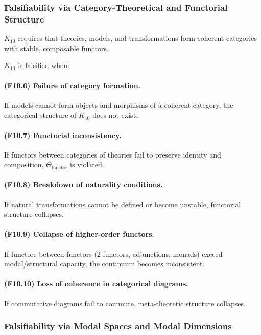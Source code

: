\subsubsection{Falsifiability via Category-Theoretical and Functorial Structure}

$K_{10}$ requires that theories, models, and transformations form coherent
categories with stable, composable functors.

$K_{10}$ is falsified when:

\paragraph{(F10.6) Failure of category formation.}
If models cannot form objects and morphisms of a coherent category,
the categorical structure of $K_{10}$ does not exist.

\paragraph{(F10.7) Functorial inconsistency.}
If functors between categories of theories fail to preserve identity
and composition, $\Theta_{\mathrm{functor}}$ is violated.

\paragraph{(F10.8) Breakdown of naturality conditions.}
If natural transformations cannot be defined or become unstable,
functorial structure collapses.

\paragraph{(F10.9) Collapse of higher-order functors.}
If functors between functors (2-functors, adjunctions, monads)
exceed modal/structural capacity, the continuum becomes inconsistent.

\paragraph{(F10.10) Loss of coherence in categorical diagrams.}
If commutative diagrams fail to commute, 
meta-theoretic structure collapses.



\subsubsection{Falsifiability via Modal Spaces and Modal Dimensions}

